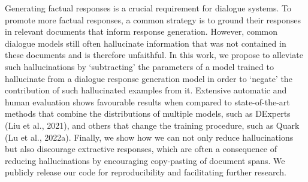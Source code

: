 Generating factual responses is a crucial requirement for dialogue systems. To promote more factual responses, a common strategy is to ground their responses in relevant documents that inform response generation. However, common dialogue models still often hallucinate information that was not contained in these documents and is therefore unfaithful. In this work, we propose to alleviate such hallucinations by ‘subtracting’ the parameters of a model trained to hallucinate from a dialogue response generation model in order to ‘negate’ the contribution of such hallucinated examples from it. Extensive automatic and human evaluation shows favourable results when compared to state-of-the-art methods that combine the distributions of multiple models, such as DExperts (Liu et al., 2021), and others that change the training procedure, such as Quark (Lu et al., 2022a). Finally, we show how we can not only reduce hallucinations but also discourage extractive responses, which are often a consequence of reducing hallucinations by encouraging copy-pasting of document spans. We publicly release our code for reproducibility and facilitating further research.